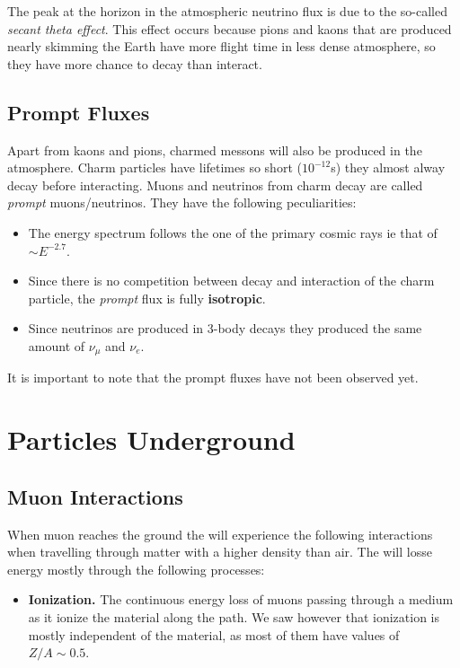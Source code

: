 \documentclass[
  letterpaper,
  DIV=11,
  numbers=noendperiod]{scrreprt}
\providecommand{\tightlist}{%
  \setlength{\itemsep}{0pt}\setlength{\parskip}{0pt}}\usepackage{longtable,booktabs,array}
\begin{document}
The peak at the horizon in the atmospheric neutrino flux is due to the
so-called \emph{secant theta effect}. This effect occurs because pions
and kaons that are produced nearly skimming the Earth have more flight
time in less dense atmosphere, so they have more chance to decay than
interact.

\subsection{Prompt Fluxes}\label{prompt-fluxes}

Apart from kaons and pions, charmed messons will also be produced in the
atmosphere. Charm particles have lifetimes so short (\(10^{-12}\)s) they
almost alway decay before interacting. Muons and neutrinos from charm
decay are called \emph{prompt} muons/neutrinos. They have the following
peculiarities:

\begin{itemize}
\tightlist
\item
  The energy spectrum follows the one of the primary cosmic rays ie that
  of \(\sim E^{-2.7}\).
\item
  Since there is no competition between decay and interaction of the
  charm particle, the \emph{prompt} flux is fully \textbf{isotropic}.
\item
  Since neutrinos are produced in 3-body decays they produced the same
  amount of \(\nu_\mu\) and \(\nu_e\).
\end{itemize}

It is important to note that the prompt fluxes have not been observed
yet.

\section{Particles Underground}\label{particles-underground}

\subsection{Muon Interactions}\label{muon-interactions}

When muon reaches the ground the will experience the following
interactions when travelling through matter with a higher density than
air. The will losse energy mostly through the following processes:

\begin{itemize}
\tightlist
\item
  \textbf{Ionization.} The continuous energy loss of muons passing
  through a medium as it ionize the material along the path. We saw
  however that ionization is mostly independent of the material, as most
  of them have values of \(Z/A \sim 0.5\).
\end{itemize}
\end{document}
